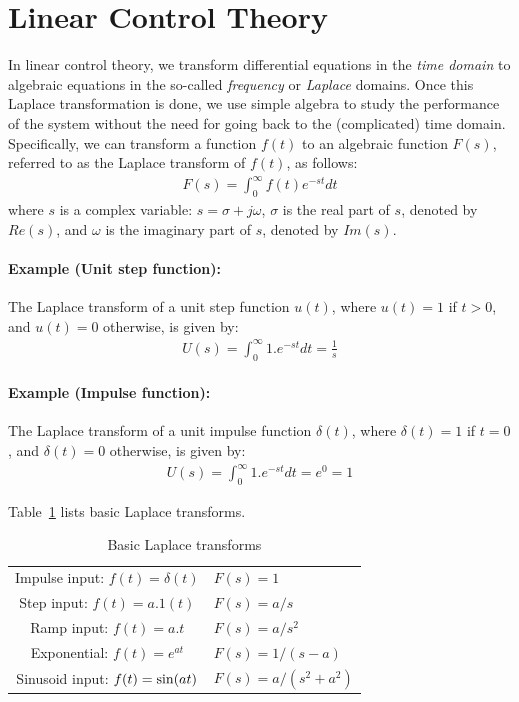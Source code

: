 \documentclass{article}
\def\sn{{\rm sin}}
\begin{document}
\section{Linear Control Theory}  
\label{sec:linear}

In linear control theory, we transform differential equations in the {\em time domain} to algebraic equations in the so-called {\em frequency} or {\em Laplace} domains. Once this Laplace transformation is done, we use simple algebra to study the performance of the system without the need for going back to the (complicated) time domain. Specifically, we can transform a function $f(t)$ to an algebraic function $F(s)$, referred to as the Laplace transform of $f(t)$, as follows:
\begin{eqnarray*}
F(s) = \int_0^{\infty} f(t) e^{-st} dt
\end{eqnarray*}
where $s$ is a complex variable: $s = \sigma + j \omega$, $\sigma$ is the real part of $s$, denoted by $Re(s)$,
and $\omega$ is the imaginary part of $s$, denoted by $Im(s)$.

\paragraph{Example (Unit step function):}
The Laplace transform of a unit step function $u(t)$, where $u(t) = 1$ if $t > 0$, and $u(t) = 0$ otherwise, is given by:
\begin{eqnarray*}
U(s) = \int_0^{\infty} 1 . e^{-st} dt = \frac{1}{s}
\end{eqnarray*}


\paragraph{Example (Impulse function):}
The Laplace transform of a unit impulse function $\delta(t)$, where $\delta(t) = 1$ if $t = 0$, and $\delta(t) = 0$ otherwise, is given by:
\begin{eqnarray*}
U(s) = \int_0^{\infty} 1 . e^{-st} dt = e^{0} = 1
\end{eqnarray*}
 
Table~\ref{tab:transforms} lists basic Laplace transforms.
\begin{table}[htdp]
\caption{Basic Laplace transforms}
\begin{center}
\begin{tabular}{|c|l|} \hline
Impulse input:	$f(t) = \delta(t)$ & $F(s) = 1$ \\ [2ex]
Step input: 	$f(t) = a.1(t)$	& $F(s) = a/s$ \\[2ex]
Ramp input: 	$f(t) = a.t$		& $F(s) = a/s^2$ \\[2ex]
Exponential:	$f(t) = e^{at}$	& $F(s) = 1/(s-a)$ \\[2ex]
Sinusoid input:	$f(t) = \sn(at)$	& $F(s) = a/(s^2+a^2)$ \\ [2ex]\hline
\end{tabular}
\end{center}
\label{tab:transforms}
\end{table}%
\end{document}
